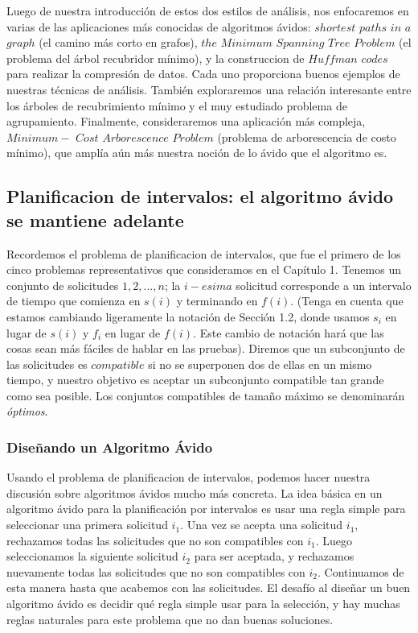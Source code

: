 \documentclass[a4paper, 12pt]{book}
\theoremstyle{dotless}
\begin{document}
Luego de nuestra introducción de estos dos estilos de análisis, nos enfocaremos en varias de las aplicaciones más conocidas de algoritmos ávidos: $shortest$ $paths$ $in$ $a$ $graph$ (el camino más corto en grafos), $the$ $Minimum$ $Spanning$ $Tree$ $Problem$ (el problema del árbol recubridor mínimo), y la construccion de $Huffman$ $codes$ para realizar la compresión de datos. Cada uno proporciona buenos ejemplos de nuestras técnicas de análisis. También exploraremos una relación interesante entre los árboles de recubrimiento mínimo y el muy estudiado problema de agrupamiento. Finalmente, consideraremos una aplicación más compleja, $Minimum-$ $Cost$ $Arborescence$ $Problem$ (problema de arborescencia de costo mínimo), que amplía aún más nuestra noción de lo ávido que el algoritmo es.\\


\subsection{Planificacion de intervalos: el algoritmo ávido se mantiene adelante} Recordemos el problema de planificacion de intervalos, que fue el primero de los cinco problemas representativos que consideramos en el Capítulo 1. Tenemos un conjunto de solicitudes ${1, 2,. . . , n}$; la $i- esima$ solicitud corresponde a un intervalo de tiempo que comienza en $s(i)$ y terminando en $f (i)$. (Tenga en cuenta que estamos cambiando ligeramente la notación de Sección 1.2, donde usamos $s_i$ en lugar de $s(i)$ y $f_i$ en lugar de $f(i)$. Este cambio de notación hará que las cosas sean más fáciles de hablar en las pruebas). Diremos que un subconjunto de las solicitudes es $compatible$ si no se superponen dos de ellas en un mismo tiempo, y nuestro objetivo es aceptar un subconjunto compatible tan grande como sea posible. Los conjuntos compatibles de tamaño máximo se denominarán \textit{óptimos}.\\

\subsubsection*{Diseñando un Algoritmo Ávido}

Usando el problema de planificacion de intervalos, podemos hacer nuestra discusión sobre algoritmos ávidos mucho más concreta. La idea básica en un algoritmo ávido para la planificación por intervalos es usar una regla simple para seleccionar una primera solicitud $i_1$. Una vez se acepta una solicitud $i_1$, rechazamos todas las solicitudes que no son compatibles con $i_1$. Luego seleccionamos la siguiente solicitud $i_2$ para ser aceptada, y rechazamos nuevamente todas las solicitudes que no son compatibles con $i_2$. Continuamos de esta manera hasta que acabemos con las solicitudes. El desafío al diseñar un buen algoritmo ávido es decidir qué regla simple usar para la selección, y hay muchas reglas naturales para este problema que no dan buenas soluciones.\\
\end{document}
